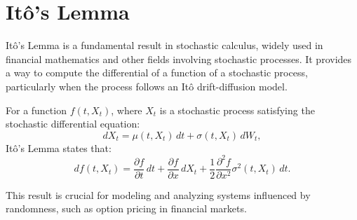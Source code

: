 \section{Itô's Lemma}

Itô's Lemma is a fundamental result in stochastic calculus, widely used in financial mathematics and other fields involving stochastic processes. It provides a way to compute the differential of a function of a stochastic process, particularly when the process follows an Itô drift-diffusion model.

For a function \( f(t, X_t) \), where \( X_t \) is a stochastic process satisfying the stochastic differential equation:
\[
    dX_t = \mu(t, X_t) \, dt + \sigma(t, X_t) \, dW_t,
\]
Itô's Lemma states that:
\[
    df(t, X_t) = \frac{\partial f}{\partial t} \, dt + \frac{\partial f}{\partial x} \, dX_t + \frac{1}{2} \frac{\partial^2 f}{\partial x^2} \sigma^2(t, X_t) \, dt.
\]

This result is crucial for modeling and analyzing systems influenced by randomness, such as option pricing in financial markets.